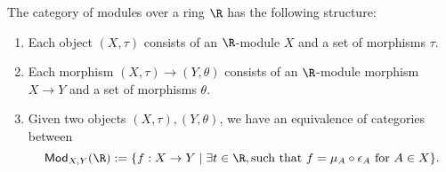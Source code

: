 \documentclass[a4paper,reqno,oneside]{article}
\begin{document}
\begin{proposition}\label{prop:coalgebra}
The category of modules over a ring $\R$ has the following structure:
\begin{enumerate}[label=\roman*]
    \item Each object $(X,\tau)$ consists of an $\R$-module $X$ and a set of morphisms $\tau$.  
    \item Each morphism $(X,\tau) \to (Y,\theta)$ consists of an $\R$-module morphism $X \to Y$ and a set of morphisms $\theta$.
    \item Given two objects $(X,\tau),(Y,\theta)$, we have an equivalence of categories between
    \begin{equation*}
        \mathsf{Mod}_{X,Y}(\R) := \{f : X \to Y\mid \exists t \in \R, \textnormal{such that } f = \mu_A \circ \epsilon_A \textrm{ for } A \in X \}.
    \end{equation*}
\end{enumerate}
\end{proposition}
\end{document}
